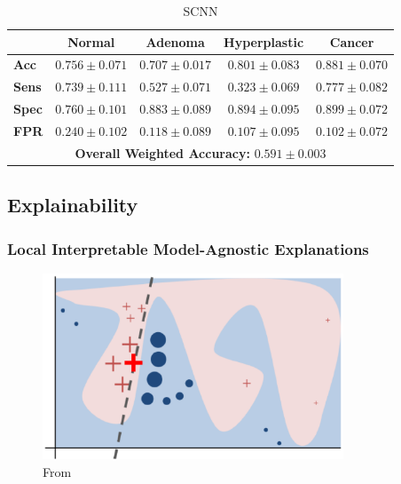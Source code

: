 \begin{table}[ht] \centering \caption{SCNN} \label{tab:scnn_tpl3}
\begin{tabular}{lcccc} \toprule & \textbf{Normal} & \textbf{Adenoma} &
\textbf{Hyperplastic} & \textbf{Cancer} \\ \midrule \textbf{Acc} & $0.756\pm0.
071$ & $0.707\pm0.017$ & $0.801\pm0.083$ & $0.881\pm0.070$ \\ \textbf{Sens} & $0.
739\pm0.111$ & $0.527\pm0.071$ & $0.323\pm0.069$ & $0.777\pm0.082$ \\
\textbf{Spec} & $0.760\pm0.101$ & $0.883\pm0.089$ & $0.894\pm0.095$ & $0.899\pm0.
072$ \\ \textbf{FPR} & $0.240\pm0.102$ & $0.118\pm0.089$ & $0.107\pm0.095$ & $0.
102\pm0.072$ \\ \midrule \multicolumn{5}{c}{\textbf{Overall Weighted Accuracy:}
$0.591\pm0.003$} \\ \bottomrule \end{tabular} \end{table}


\subsection{Explainability}
\subsubsection{Local Interpretable Model-Agnostic Explanations}
\begin{figure}[htbp]
  \centering
  \includegraphics[width=0.8\textwidth]{Images/lime_explanation.png}
  \caption{From \cite{ribeiro_why_2016}}
  \label{fig:my-label}
\end{figure}

